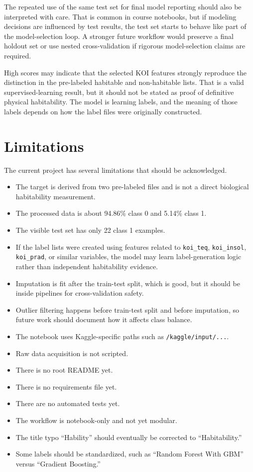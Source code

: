 \documentclass[11pt]{article}
\begin{document}
The repeated use of the same test set for final model reporting should also be interpreted with care. That is common in course notebooks, but if modeling decisions are influenced by test results, the test set starts to behave like part of the model-selection loop. A stronger future workflow would preserve a final holdout set or use nested cross-validation if rigorous model-selection claims are required.

High scores may indicate that the selected KOI features strongly reproduce the distinction in the pre-labeled habitable and non-habitable lists. That is a valid supervised-learning result, but it should not be stated as proof of definitive physical habitability. The model is learning labels, and the meaning of those labels depends on how the label files were originally constructed.

\section{Limitations}

The current project has several limitations that should be acknowledged.

\begin{itemize}
  \item The target is derived from two pre-labeled files and is not a direct biological habitability measurement.
  \item The processed data is about 94.86\% class 0 and 5.14\% class 1.
  \item The visible test set has only 22 class 1 examples.
  \item If the label lists were created using features related to \texttt{koi\_teq}, \texttt{koi\_insol}, \texttt{koi\_prad}, or similar variables, the model may learn label-generation logic rather than independent habitability evidence.
  \item Imputation is fit after the train-test split, which is good, but it should be inside pipelines for cross-validation safety.
  \item Outlier filtering happens before train-test split and before imputation, so future work should document how it affects class balance.
  \item The notebook uses Kaggle-specific paths such as \texttt{/kaggle/input/...}.
  \item Raw data acquisition is not scripted.
  \item There is no root README yet.
  \item There is no requirements file yet.
  \item There are no automated tests yet.
  \item The workflow is notebook-only and not yet modular.
  \item The title typo ``Hability'' should eventually be corrected to ``Habitability.''
  \item Some labels should be standardized, such as ``Random Forest With GBM'' versus ``Gradient Boosting.''
\end{itemize}
\end{document}
